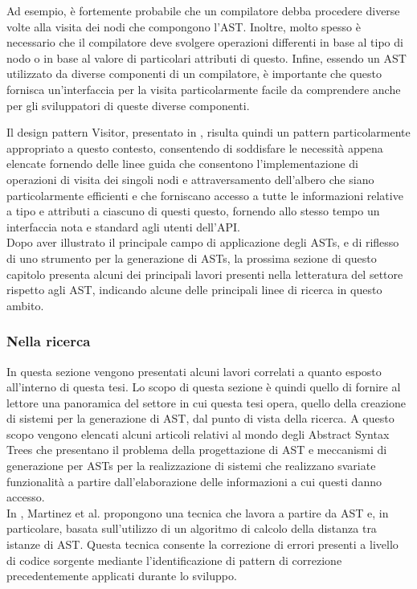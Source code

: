 Ad esempio, è fortemente probabile che un compilatore debba procedere diverse
volte alla visita dei nodi che compongono l’AST. Inoltre, molto spesso è
necessario che il compilatore deve svolgere operazioni differenti in base al
tipo di nodo o in base al valore di particolari attributi di questo. Infine,
essendo un AST utilizzato da diverse componenti di un compilatore, è importante
che questo fornisca un’interfaccia per la visita particolarmente facile da
comprendere anche per gli sviluppatori di queste diverse componenti.

Il design pattern Visitor, presentato in \cite{gamma1995design}, risulta quindi
un pattern particolarmente appropriato a questo contesto, consentendo di
soddisfare le necessità appena elencate fornendo delle linee guida che
consentono l’implementazione di operazioni di visita dei singoli nodi e
attraversamento dell’albero che siano particolarmente efficienti e che
forniscano accesso a tutte le informazioni relative a tipo e attributi a
ciascuno di questi questo, fornendo allo stesso tempo un interfaccia nota e
standard agli utenti dell’API.\\

Dopo aver illustrato il principale campo di applicazione degli ASTs, e di
riflesso di uno strumento per la generazione di ASTs, la prossima sezione di
questo capitolo presenta alcuni dei principali lavori presenti nella
letteratura del settore rispetto agli AST, indicando alcune delle principali
linee di ricerca in questo ambito.

\subsubsection{Nella ricerca}

In questa sezione vengono presentati alcuni lavori correlati a quanto esposto
all’interno di questa tesi. Lo scopo di questa sezione è quindi quello di
fornire al lettore una panoramica del settore in cui questa tesi opera, quello
della creazione di sistemi per la generazione di AST, dal punto di vista della
ricerca. A questo scopo vengono elencati alcuni articoli relativi al mondo
degli Abstract Syntax Trees che presentano il problema della progettazione di
AST  e meccanismi di generazione per ASTs per la realizzazione di sistemi che
realizzano svariate funzionalità a partire dall’elaborazione delle informazioni
a cui questi danno accesso.\\

In \cite{martinez2014accurate}, Martinez et al. propongono una tecnica che
lavora a partire da AST e, in particolare, basata sull’utilizzo di un algoritmo
di calcolo della distanza tra istanze di AST. Questa tecnica consente la
correzione di errori presenti a livello di codice sorgente mediante
l’identificazione di pattern di correzione precedentemente applicati durante lo
sviluppo.

